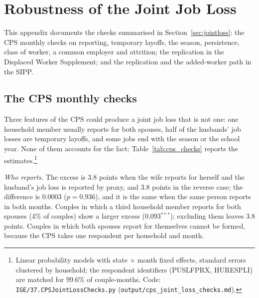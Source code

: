 \section{Robustness of the Joint Job Loss}\label{app:robust}

This appendix documents the checks summarised in Section~\ref{sec:jointloss}: the CPS monthly checks on reporting,
temporary layoffs, the season, persistence, class of worker, a common employer and attrition; the replication in the
Displaced Worker Supplement; and the replication and the added-worker path in the SIPP.

\subsection{The CPS monthly checks}

Three features of the CPS could produce a joint job loss that is not one: one household member usually reports for
both spouses, half of the husbands' job losses are temporary layoffs, and some jobs end with the season or the school
year. None of them accounts for the fact; Table~\ref{tab:cps_checks} reports the estimates.\footnote{Linear probability models with state $\times$ month fixed effects,
standard errors clustered by household; the respondent identifiers (PUSLFPRX, HURESPLI) are matched for 99.6\% of
couple-months. Code: \texttt{IGE/37.CPSJointLossChecks.py} (\texttt{output/cps\_joint\_loss\_checks.md}).}

\emph{Who reports.} The excess is 3.8 points when the wife reports for herself and the husband's job loss is reported by
proxy, and 3.8 points in the reverse case; the difference is 0.0003 ($p=0.936$), and it is the same when the same person
reports in both months. Couples in which a third household member reports for both spouses (4\% of couples) show a
larger excess (0.093$^{***}$); excluding them leaves 3.8 points. Couples in which both spouses report for themselves
cannot be formed, because the CPS takes one respondent per household and month.


